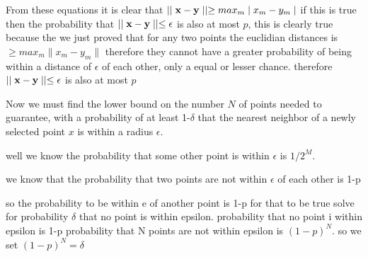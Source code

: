 \documentclass[solution, letterpaper]{cs121}
\begin{document}
From these equations it is clear that $\|\| {\bf x - y} \|\|  \geq  max_m \| x_m-y_m \| $ if this is true then the probability that $\|\| {\bf x - y} \|\| \leq \epsilon$ is also at most $p$, this is clearly true because the we just proved that for any two points the euclidian distances is $\geq  max_m \| x_m-y_m \| $ therefore they cannot have a greater probability of being within a distance of $\epsilon$ of each other, only a equal or lesser chance. therefore $\|\| {\bf x - y} \|\| \leq \epsilon$ is also at most $p$

\subproblem %
Now we must find the lower bound on the number $N$ of points needed to guarantee, with a probability of at least 1-$\delta$ that the nearest neighbor of a newly selected point $x$ is within a radius $\epsilon$. 

well we know the probability that some other point is within $\epsilon$ is $1/2^M$. 

we know that the probability that two points are not within $\epsilon$ of each other is 1-p

so the probability to be within e of another point is 1-p for that to be true 
solve for probability $\delta$ that no point is within epsilon. probability that no point i within epsilon is 1-p
probability that N points are not within epsilon is $(1-p)^N$. so we set $(1-p)^N = \delta$ 



\end{document}

